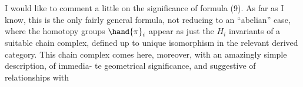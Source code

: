 I would like to comment a little on the significance of formula (9).
 As far as I know,  this is the only fairly general formula,  not
reducing to an ``abelian'' case,  where the homotopy groups $\hand{\pi}_i$  appear
as just the $H_i$  invariants of a suitable chain complex,  defined up to
unique isomorphism in the relevant derived category.  This chain complex
comes here,  moreover,  with an amazingly simple description,  of immedia-%
te geometrical significance,  and suggestive of  relationships with


